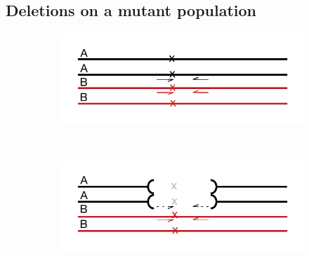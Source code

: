 \subsection{Deletions on a mutant population}

\begin{figure}
    \centering
    \begin{subfigure}[b]{0.45\textwidth}
        \caption{}
        \includegraphics[width=1\textwidth]{PolyMarker/Figures/deletions/wt.pdf}
        \label{fig:poly:wt}
    \end{subfigure}
    ~
     \begin{subfigure}[b]{0.45\textwidth}
        \caption{}
        \includegraphics[width=1\textwidth]{PolyMarker/Figures/deletions/homM4.pdf}
        \label{fig:poly:homM4}
    \end{subfigure}
    \begin{subfigure}[b]{0.3\textwidth}
        \caption{}

\end{subfigure}
\end{figure}

